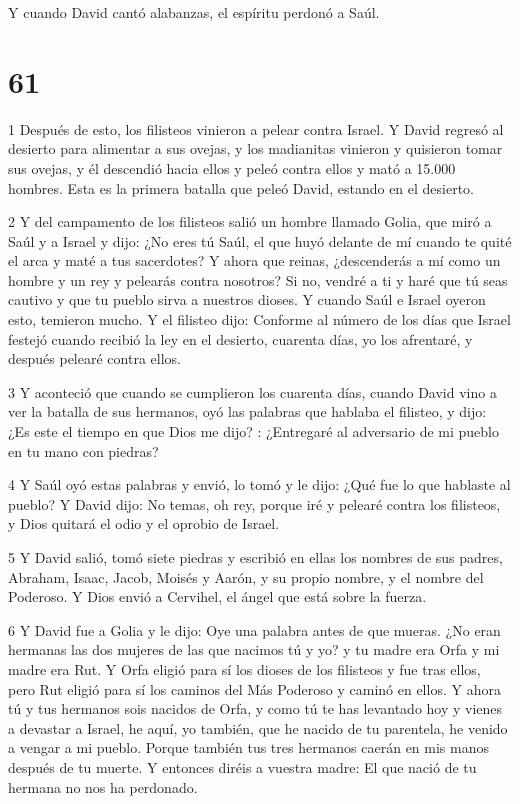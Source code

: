 Y cuando David cantó alabanzas, el espíritu perdonó a Saúl.

\chapter{61}

\par 1 Después de esto, los filisteos vinieron a pelear contra Israel. Y David regresó al desierto para alimentar a sus ovejas, y los madianitas vinieron y quisieron tomar sus ovejas, y él descendió hacia ellos y peleó contra ellos y mató a 15.000 hombres. Esta es la primera batalla que peleó David, estando en el desierto.

\par 2 Y del campamento de los filisteos salió un hombre llamado Golia, que miró a Saúl y a Israel y dijo: ¿No eres tú Saúl, el que huyó delante de mí cuando te quité el arca y maté a tus sacerdotes? Y ahora que reinas, ¿descenderás a mí como un hombre y un rey y pelearás contra nosotros? Si no, vendré a ti y haré que tú seas cautivo y que tu pueblo sirva a nuestros dioses. Y cuando Saúl e Israel oyeron esto, temieron mucho. Y el filisteo dijo: Conforme al número de los días que Israel festejó cuando recibió la ley en el desierto, cuarenta días, yo los afrentaré, y después pelearé contra ellos.

\par 3 Y aconteció que cuando se cumplieron los cuarenta días, cuando David vino a ver la batalla de sus hermanos, oyó las palabras que hablaba el filisteo, y dijo: ¿Es este el tiempo en que Dios me dijo? : ¿Entregaré al adversario de mi pueblo en tu mano con piedras?

\par 4 Y Saúl oyó estas palabras y envió, lo tomó y le dijo: ¿Qué fue lo que hablaste al pueblo? Y David dijo: No temas, oh rey, porque iré y pelearé contra los filisteos, y Dios quitará el odio y el oprobio de Israel.

\par 5 Y David salió, tomó siete piedras y escribió en ellas los nombres de sus padres, Abraham, Isaac, Jacob, Moisés y Aarón, y su propio nombre, y el nombre del Poderoso. Y Dios envió a Cervihel, el ángel que está sobre la fuerza.

\par 6 Y David fue a Golia y le dijo: Oye una palabra antes de que mueras. ¿No eran hermanas las dos mujeres de las que nacimos tú y yo? y tu madre era Orfa y mi madre era Rut. Y Orfa eligió para sí los dioses de los filisteos y fue tras ellos, pero Rut eligió para sí los caminos del Más Poderoso y caminó en ellos. Y ahora tú y tus hermanos sois nacidos de Orfa, y como tú te has levantado hoy y vienes a devastar a Israel, he aquí, yo también, que he nacido de tu parentela, he venido a vengar a mi pueblo. Porque también tus tres hermanos caerán en mis manos después de tu muerte. Y entonces diréis a vuestra madre: El que nació de tu hermana no nos ha perdonado.


